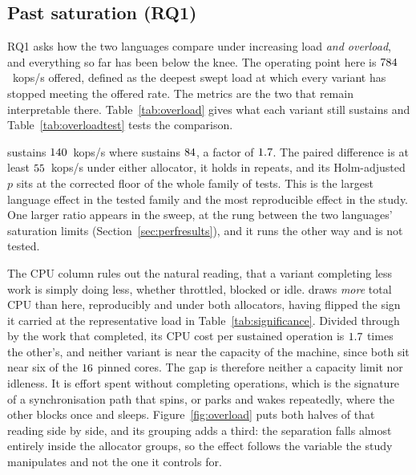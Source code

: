 \documentclass[english,oneside,a4paper,censored,csm,software-track-2020]{HYthesisML}
\begin{document}
\subsection{Past saturation (RQ1)}\label{sec:overload}
RQ1 asks how the two languages compare under increasing load \emph{and overload}, and everything
so far has been below the knee. The operating point here is $784$~kops/s offered,
defined as the deepest swept load at which every variant has stopped meeting the offered rate.
The metrics are the two that remain interpretable there. Table~\ref{tab:overload} gives what
each variant still sustains and Table~\ref{tab:overloadtest} tests the comparison.

\OverloadSustainedFaster{} sustains $140$~kops/s where \OverloadSustainedSlower{}
sustains $84$, a factor of $1.7$. The paired difference is at least
$55$~kops/s under either allocator, it holds in \OverloadThrAgree{} repeats, and
its Holm-adjusted $p$ sits at the corrected floor of the whole family of \NTests{} tests. This is
the largest language effect in the tested family and the most reproducible effect in the study.
One larger ratio appears in the sweep, at the rung between the two languages' saturation limits
(Section~\ref{sec:perfresults}), and it runs the other way and is not tested.

The CPU column rules out the natural reading, that a variant completing less work is simply doing
less, whether throttled, blocked or idle. \OverloadSustainedSlower{} draws \emph{more} total CPU
than \OverloadSustainedFaster{} here, reproducibly and under both allocators, having flipped the
sign it carried at the representative load in Table~\ref{tab:significance}. Divided through by
the work that completed, its CPU cost per sustained operation is $1.7$ times
the other's, and neither variant is near the capacity of the machine, since both sit near six of
the $16$ pinned cores. The gap is therefore neither a capacity limit nor idleness.
It is effort spent without completing operations, which is the signature of a synchronisation
path that spins, or parks and wakes repeatedly, where the other blocks once and sleeps.
Figure~\ref{fig:overload} puts both halves of that reading side by side, and its grouping adds a
third: the separation falls almost entirely inside the allocator groups, so the effect follows the
variable the study manipulates and not the one it controls for.
\end{document}
